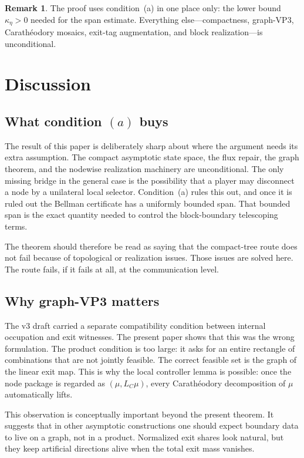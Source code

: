 \documentclass[12pt]{article}
\theoremstyle{definition}
\newtheorem{remark}[theorem]{Remark}
\newcommand{\1}{\mathbf{1}}
\begin{document}
\begin{remark}
The proof uses condition~(a) in one place only: the lower bound \(\kappa_\eta>0\) needed
for the span estimate.  Everything else---compactness, graph-VP3, Carath\'eodory mosaics,
exit-tag augmentation, and block realization---is unconditional.
\end{remark}

\section{Discussion}
\label{sec:discussion}

\subsection{What condition \texorpdfstring{$(a)$}{(a)} buys}

The result of this paper is deliberately sharp about where the argument needs its extra
assumption.  The compact asymptotic state space, the flux repair, the graph theorem, and
the nodewise realization machinery are unconditional.  The only missing bridge in the
general case is the possibility that a player may disconnect a node by a unilateral local
selector.  Condition~(a) rules this out, and once it is ruled out the Bellman certificate
has a uniformly bounded span.  That bounded span is the exact quantity needed to control
the block-boundary telescoping terms.

The theorem should therefore be read as saying that the compact-tree route does not fail
because of topological or realization issues.  Those issues are solved here.  The route
fails, if it fails at all, at the communication level.

\subsection{Why graph-VP3 matters}

The v3 draft carried a separate compatibility condition between internal occupation and
exit witnesses.  The present paper shows that this was the wrong formulation.  The product
condition is too large: it asks for an entire rectangle of combinations that are not
jointly feasible.  The correct feasible set is the graph of the linear exit map.  This is
why the local controller lemma is possible: once the node package is regarded as
\((\mu,L_C\mu)\), every Carath\'eodory decomposition of \(\mu\) automatically lifts.

This observation is conceptually important beyond the present theorem.  It suggests that in
other asymptotic constructions one should expect boundary data to live on a graph, not in
a product.  Normalized exit shares look natural, but they keep artificial directions alive
when the total exit mass vanishes.
\end{document}
